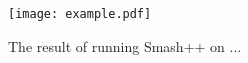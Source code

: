 
\begin{figure}[!h]
  \texttt{[image: example.pdf]}
  \caption{The result of running Smash++ on ...}
  \label{fig.example}
\end{figure}